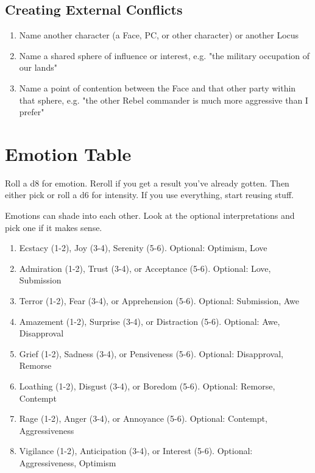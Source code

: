 \documentclass[10pt,oneside,letterpaper,landscape]{memoir}
\begin{document}
\begin{multicols}{3}
\subsection{Creating External Conflicts}

\begin{enumerate}
\item Name another character (a Face, PC, or other character) or another Locus
\item Name a shared sphere of influence or interest, e.g. "the military occupation of our lands"
\item Name a point of contention between the Face and that other party within that sphere, e.g. "the other Rebel commander is much more aggressive than I prefer"
\end{enumerate}

\vfill\null %

\columnbreak

\section{Emotion Table}

Roll a d8 for emotion. Reroll if you get a result you've already gotten. Then either pick or roll a d6 for intensity. If you use everything, start reusing stuff.

Emotions can shade into each other. Look at the optional interpretations and pick one if it makes sense.

\begin{enumerate}
\item [1:] Ecstacy (1-2), Joy (3-4), Serenity (5-6). Optional: Optimism, Love
\item [2:] Admiration (1-2), Trust (3-4), or Acceptance (5-6). Optional: Love, Submission
\item [3:] Terror (1-2), Fear (3-4), or Apprehension (5-6). Optional: Submission, Awe
\item [4:] Amazement (1-2), Surprise (3-4), or Distraction (5-6). Optional: Awe, Disapproval
\item [5:] Grief (1-2), Sadness (3-4), or Pensiveness (5-6). Optional: Disapproval, Remorse
\item [6:] Loathing (1-2), Disgust (3-4), or Boredom (5-6). Optional: Remorse, Contempt
\item [7:] Rage (1-2), Anger (3-4), or Annoyance (5-6). Optional: Contempt, Aggressiveness
\item [8:] Vigilance (1-2), Anticipation (3-4), or Interest (5-6). Optional: Aggressiveness, Optimism
\end{enumerate}


\end{multicols}
\end{document}
